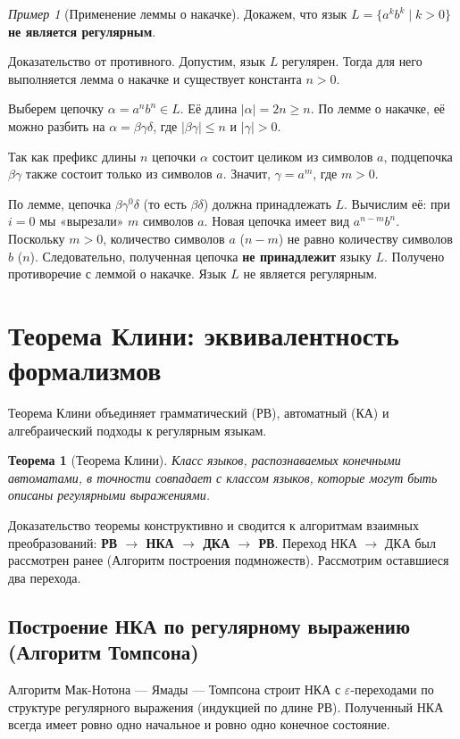 \documentclass[12pt,a4paper]{article}
\theoremstyle{definition}
\theoremstyle{plain}
\newtheorem{theorem}{Теорема}
\theoremstyle{remark}
\newtheorem{example}{Пример}
\begin{document}
\begin{example}[Применение леммы о накачке]
Докажем, что язык $L = \{a^k b^k \mid k > 0\}$ \textbf{не является регулярным}.

Доказательство от противного. Допустим, язык $L$ регулярен. Тогда для него выполняется лемма о накачке и существует константа $n > 0$.

Выберем цепочку $\alpha = a^n b^n \in L$. Её длина $|\alpha| = 2n \ge n$. По лемме о накачке, её можно разбить на $\alpha = \beta\gamma\delta$, где $|\beta\gamma| \le n$ и $|\gamma| > 0$.

Так как префикс длины $n$ цепочки $\alpha$ состоит целиком из символов $a$, подцепочка $\beta\gamma$ также состоит только из символов $a$. Значит, $\gamma = a^m$, где $m > 0$.

По лемме, цепочка $\beta\gamma^0\delta$ (то есть $\beta\delta$) должна принадлежать $L$.
Вычислим её: при $i=0$ мы «вырезали» $m$ символов $a$. Новая цепочка имеет вид $a^{n-m} b^n$.
Поскольку $m > 0$, количество символов $a$ ($n-m$) не равно количеству символов $b$ ($n$). Следовательно, полученная цепочка \textbf{не принадлежит} языку $L$. Получено противоречие с леммой о накачке. Язык $L$ не является регулярным.
\end{example}

\newpage

\section{Теорема Клини: эквивалентность формализмов}

Теорема Клини объединяет грамматический (РВ), автоматный (КА) и алгебраический подходы к регулярным языкам.

\begin{theorem}[Теорема Клини]
Класс языков, распознаваемых конечными автоматами, в точности совпадает с классом языков, которые могут быть описаны регулярными выражениями.
\end{theorem}

Доказательство теоремы конструктивно и сводится к алгоритмам взаимных преобразований: \textbf{РВ $\to$ НКА $\to$ ДКА $\to$ РВ}. Переход НКА $\to$ ДКА был рассмотрен ранее (Алгоритм построения подмножеств). Рассмотрим оставшиеся два перехода.

\subsection{Построение НКА по регулярному выражению (Алгоритм Томпсона)}
Алгоритм Мак-Нотона — Ямады — Томпсона строит НКА с $\varepsilon$-переходами по структуре регулярного выражения (индукцией по длине РВ). Полученный НКА всегда имеет ровно одно начальное и ровно одно конечное состояние.
\end{document}
